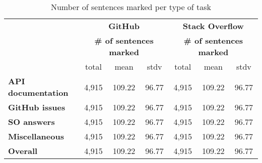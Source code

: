 \begin{table}[H]
\centering    
\caption{Number of sentences marked per type of task}
\label{tbl:corpus-annotation-summary-by-task}
\begin{scriptsize}
\begin{threeparttable}
\begin{tabular}{lcccccc}



& \multicolumn{3}{c}{\textbf{GitHub}} & \multicolumn{3}{c}{\textbf{Stack Overflow}} \\

& \multicolumn{3}{c}{\textbf{\# of sentences marked}} 
& \multicolumn{3}{c}{\textbf{\# of sentences marked}}
\\ \cmidrule(l){2-4}  \cmidrule(l){5-7} 

& total & mean & stdv 
%
& total & mean & stdv
\\

\hline

\textbf{API documentation} 
& 4,915 & 109.22 & 96.77 %
& 4,915 & 109.22 & 96.77 %
\\
\textbf{GitHub issues} 
& 4,915 & 109.22 & 96.77 %
& 4,915 & 109.22 & 96.77 %
\\
\textbf{SO answers} 
& 4,915 & 109.22 & 96.77 %
& 4,915 & 109.22 & 96.77 %
\\
\textbf{Miscellaneous} 
& 4,915 & 109.22 & 96.77 %
& 4,915 & 109.22 & 96.77 %
\\

\hline
\textbf{Overall} 
& 4,915 & 109.22 & 96.77 %
& 4,915 & 109.22 & 96.77 %
\\
\hline

\end{tabular}
\end{threeparttable}
\end{scriptsize}
\end{table}


